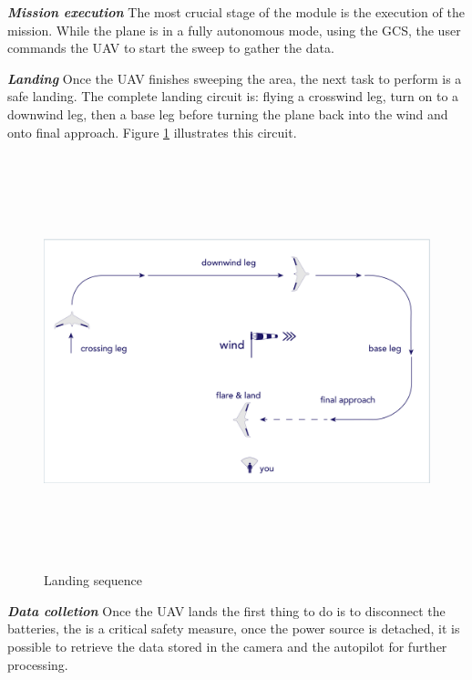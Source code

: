 \textit{\textbf{Mission execution}} \newline
The most crucial stage of the module is the execution of the mission. While the plane is in a fully autonomous mode, using the GCS, the user commands the UAV to start the sweep to gather the data.

\textit{\textbf{Landing}} \newline
Once the UAV finishes sweeping the area, the next task to perform is a safe landing. The complete landing circuit is: flying a crosswind leg, turn on to a downwind leg, then a base leg before turning the plane back into the wind and onto final approach. Figure \ref{fig:Landing} illustrates this circuit.
\begin{figure}[H]
\centering
\includegraphics[width=12cm,height=12cm,keepaspectratio]{imagenes/secuencia-aterrizaje-01.png}
\caption{Landing sequence}
\label{fig:Landing}
\end{figure}

\textit{\textbf{Data colletion}} \newline
Once the UAV lands the first thing to do is to disconnect the batteries, the is a critical safety measure, once the power source is detached, it is possible to retrieve the data stored in the camera and the autopilot for further processing. 

